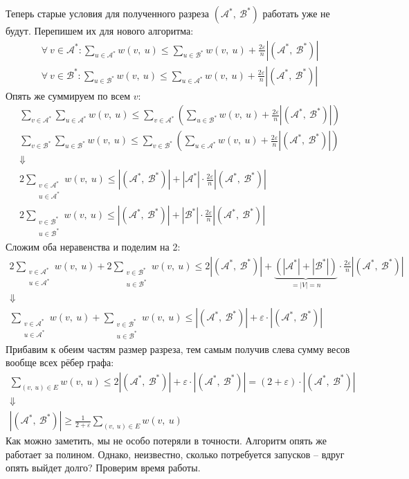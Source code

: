 \documentclass[a4paper,12pt]{article}
\newcommand{\A}{\mathcal{A}}
\newcommand{\B}{\mathcal{B}}
\begin{document}
Теперь старые условия для полученного разреза $(\A^*,\ \B^*)$ работать уже не будут. Перепишем их для нового алгоритма:
\begin{gather*}
    \forall\ v \in \A^*: \sum\limits_{u \in \A^*}w(v,\ u) \leqslant \sum\limits_{u \in \B^*}w(v,\ u) + \displaystyle\frac{2\varepsilon}{n}|(\A^*,\ \B^*)|\\
    \forall\ v \in \B^*: \sum\limits_{u \in \B^*}w(v,\ u) \leqslant \sum\limits_{u \in \A^*}w(v,\ u) + \displaystyle\frac{2\varepsilon}{n}|(\A^*,\ \B^*)|
\end{gather*}
Опять же суммируем по всем $v$:
\begin{gather*}
    \sum\limits_{v \in \A^*}\sum\limits_{u \in \A^*}w(v,\ u) \leqslant \sum\limits_{v \in \A^*}\left(\sum\limits_{u \in \B^*}w(v,\ u) + \displaystyle\frac{2\varepsilon}{n}|(\A^*,\ \B^*)|\right)\\
    \sum\limits_{v \in \B^*}\sum\limits_{u \in \B^*}w(v,\ u) \leqslant \sum\limits_{v \in \B^*}\left( \sum\limits_{u \in \A^*}w(v,\ u) + \displaystyle\frac{2\varepsilon}{n}|(\A^*,\ \B^*)|\right)\\
    \Downarrow\\
    2\sum\limits_{\substack{v \in \A^*\\u \in \A^*}}w(v,\ u) \leqslant |(\A^*,\ \B^*)| + |\A^*| \cdot \displaystyle\frac{2\varepsilon}{n}|(\A^*,\ \B^*)|\\
    2\sum\limits_{\substack{v \in \B^*\\u \in \B^*}}w(v,\ u) \leqslant |(\A^*,\ \B^*)| + |\B^*| \cdot \displaystyle\frac{2\varepsilon}{n}|(\A^*,\ \B^*)|
\end{gather*}
Сложим оба неравенства и поделим на 2:
\begin{gather*}
    2\sum\limits_{\substack{v \in \A^*\\u \in \A^*}}w(v,\ u) +  2\sum\limits_{\substack{v \in \B^*\\u \in \B^*}}w(v,\ u) \leqslant 2|(\A^*,\ \B^*)| + \underbrace{\left(|\A^*| + |\B^*|\right)}_{= |V| = n}\cdot\displaystyle\frac{2\varepsilon}{n}|(\A^*,\ \B^*)|\\ \Downarrow\\
    \sum\limits_{\substack{v \in \A^*\\u \in \A^*}}w(v,\ u) +  \sum\limits_{\substack{v \in \B^*\\u \in \B^*}}w(v,\ u) \leqslant |(\A^*,\ \B^*)| + \varepsilon\cdot|(\A^*,\ \B^*)|
\end{gather*}
Прибавим к обеим частям размер разреза, тем самым получив слева сумму весов вообще всех рёбер графа:
\begin{gather*}
    \sum\limits_{(v,\ u) \in E}w(v,\ u) \leqslant 2|(\A^*,\ \B^*)|+ \varepsilon\cdot|(\A^*,\ \B^*)| = (2 + \varepsilon) \cdot |(\A^*,\ \B^*)| \\ \Downarrow \\
    |(\A^*,\ \B^*)| \geqslant \frac{1}{2 + \varepsilon}\sum\limits_{(v,\ u) \in E}w(v,\ u)
\end{gather*}
Как можно заметить, мы не особо потеряли в точности. Алгоритм опять же работает за полином. Однако, неизвестно, сколько потребуется запусков -- вдруг опять выйдет долго? Проверим время работы.
\end{document}
